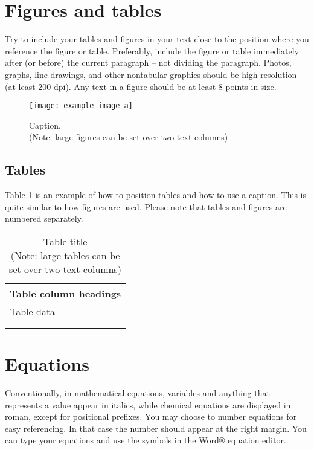 \documentclass{paper}
\begin{document}
\section{Figures and tables}

Try to include your tables and figures in your text close to the position where you reference the figure or table.
Preferably, include the figure or table immediately after (or before) the current paragraph – not dividing the paragraph.
Photos, graphs, line drawings, and other nontabular graphics should be high resolution (at least 200 dpi).
Any text in a figure should be at least 8 points in size.

\begin{figure}[H]
    \centering
    \texttt{[image: example-image-a]}
    \caption{Caption.\\(Note: large figures can be set over two text columns)}
\end{figure}

\subsection{Tables}

Table 1 is an example of how to position tables and how to use a caption.
This is quite similar to how figures are used.
Please note that tables and figures are numbered separately.

\begin{table}[H]
    \centering
    \begin{tabular}{|p{\columnwidth}|}
        \hline
        Table column headings\\
        \hline
        Table data\\\\\\
        \hline
    \end{tabular}
    \caption{Table title\\(Note: large tables can be set over two text columns)}
\end{table}

\section{Equations}

Conventionally, in mathematical equations, variables and anything that represents a value appear in italics, while chemical equations are displayed in roman, except for positional prefixes.
You may choose to number equations for easy referencing.
In that case the number should appear at the right margin.
You can type your equations and use the symbols in the Word® equation editor.
\end{document}
